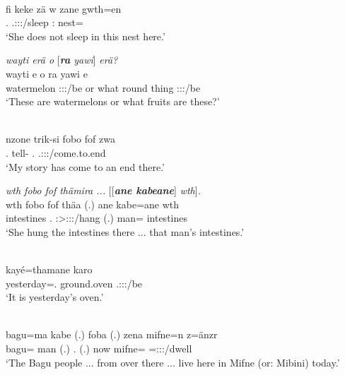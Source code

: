 \begin{exe}
 	\\
 	\gll fi keke zä w zane gwth=en\\
 	\Third.{\Abs} {\Neg} {\Prox} \Tsg.\F:\Sbj:\Nonpast:\Ipfv/sleep \Dem:{\Prox} nest={\Loc}\\
 	\trans `She does not sleep in this nest here.'
 	\label{ex512}
\end{exe}
\begin{exe}
 	\ex \emph{wayti erä o} [\emph{\textbf{ra} yawi}] \emph{erä?}\\
 	\gll wayti e o ra yawi e\\
 	watermelon \Stpl:\Sbj:\Nonpast:\Ipfv/be or what {round thing} \Stpl:\Sbj:\Nonpast:\Ipfv/be\\
 	\trans `These are watermelons or what fruits are these?'
 	\label{ex513}
\end{exe}
\begin{exe}
 	\\
 	\gll nzone trik-si fobo fof zwa\\
 	\Fsg.{\Poss} tell-{\Nmlz} \Dist.{\All} {\Emph} \Tsg.\F:\Sbj:\Rpst:\Ipfv/come.to.end\\
 	\trans `My story has come to an end there.'
 	\label{ex514}
\end{exe}
\begin{exe}
 	\ex \emph{wth fobo fof thämira ...} [[\emph{\textbf{ane kabeane}}] \emph{wth}]\emph{.}\\
 	\gll wth fobo fof thäa (.) ane kabe=ane wth\\
 	intestines \Dist.{\All} {\Emph} \Stsg:\Sbj>\Stpl:\Obj:\Pst:\Pfv/hang (.) {\Dem} man={\Poss} intestines\\
 	\trans `She hung the intestines there ... that man's intestines.'
 	\label{ex515}
\end{exe}
\begin{exe}
	\\
	\gll kayé=thamane karo \\
	yesterday=\Temp.{\Poss} {ground.oven} \Tsg.\F:\Sbj:\Nonpast:\Ipfv/be\\
	\trans `It is yesterday's oven.'
	\label{ex516}
\end{exe}
\begin{exe}
 	\\
 	\gll bagu=ma kabe (.) foba (.) zena mifne=n z=änzr\\
 	bagu={\Char} man (.) \Dist.{\Abl} (.) now mifne={\Loc} \Prox=\Stpl:\Sbj:\Nonpast:\Ipfv/dwell\\
 	\trans `The Bagu people ... from over there ... live here in Mifne (or: Mibini) today.'
 	\label{ex517}
\end{exe}

